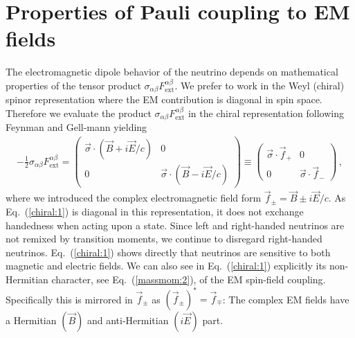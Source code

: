 \documentclass{ws-ijmpa}
\newcommand{\req}[1]{Eq.~(\ref{#1})}
\begin{document}
\section{Properties of Pauli coupling to EM fields}
\label{sec:numoment}
The electromagnetic dipole behavior of the neutrino depends on mathematical properties of the tensor product $\sigma_{\alpha\beta}F^{\alpha\beta}_\mathrm{ext}$. We prefer to work in the Weyl (chiral) spinor representation where the EM contribution is diagonal in spin space. Therefore we evaluate the product $\sigma_{\alpha\beta}F^{\alpha\beta}_\mathrm{ext}$ in the chiral representation following Feynman and Gell-mann\cite{Feynman:1958ty} yielding
\begin{align}
\label{chiral:1}
-\frac{1}{2}\sigma_{\alpha\beta}F^{\alpha\beta}_\mathrm{ext}=
\begin{pmatrix}
\vec{\sigma}\cdot(\vec{B}+i\vec{E}/c) & 0\\
0 & \vec{\sigma}\cdot(\vec{B}-i\vec{E}/c)
\end{pmatrix}\equiv
\begin{pmatrix}
\vec{\sigma}\cdot\vec{f}_{+} & 0 \\
0 & \vec{\sigma}\cdot\vec{f}_{-}
\end{pmatrix}\,,
\end{align}
where we introduced the complex electromagnetic field form $\vec{f}_{\pm}=\vec{B}\pm i\vec{E}/c$. As \req{chiral:1} is diagonal in this representation, it does not exchange handedness when acting upon a state. Since left and right-handed neutrinos are not remixed by transition moments, we continue to disregard right-handed neutrinos. \req{chiral:1} shows directly that neutrinos are sensitive to both magnetic and electric fields. We can also see in \req{chiral:1} explicitly its non-Hermitian character, see \req{massmom:2}, of the EM spin-field coupling. Specifically this is mirrored in $\vec{f}_{\pm}$ as $(\vec{f}_{\pm})^{*}=\vec{f}_{\mp}$: The complex EM fields have a Hermitian $(\vec{B})$ and anti-Hermitian $(i\vec{E})$ part.
\end{document}
